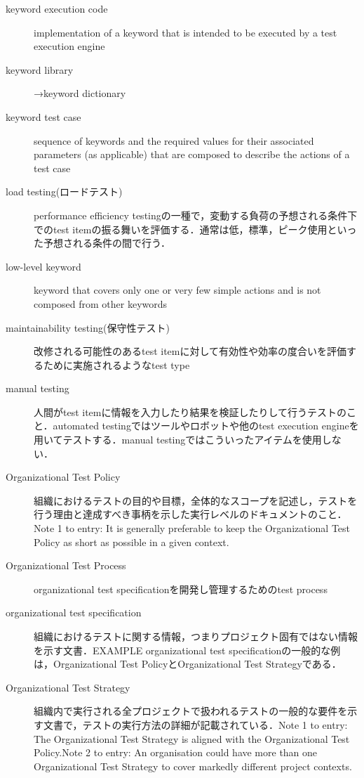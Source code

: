 \begin{description}
    \item[keyword execution code]implementation of a keyword that is intended to be executed by a test execution engine
    \item[keyword library]→keyword dictionary
    \item[keyword test case]sequence of keywords and the required values for their associated parameters (as applicable) that are composed to describe the actions of a test case
    \item[load testing(ロードテスト)]performance efficiency testingの一種で，変動する負荷の予想される条件下でのtest itemの振る舞いを評価する．通常は低，標準，ピーク使用といった予想される条件の間で行う．
    \item[low-level keyword]keyword that covers only one or very few simple actions and is not composed from other keywords
    \item[maintainability testing(保守性テスト)]改修される可能性のあるtest itemに対して有効性や効率の度合いを評価するために実施されるようなtest type
    \item[manual testing]人間がtest itemに情報を入力したり結果を検証したりして行うテストのこと．automated testingではツールやロボットや他のtest execution engineを用いてテストする．manual testingではこういったアイテムを使用しない．
    \item[Organizational Test Policy]組織におけるテストの目的や目標，全体的なスコープを記述し，テストを行う理由と達成すべき事柄を示した実行レベルのドキュメントのこと．Note 1 to entry: It is generally preferable to keep the Organizational Test Policy as short as possible in a given context.
    \item[Organizational Test Process]organizational test specificationを開発し管理するためのtest process
    \item[organizational test specification]組織におけるテストに関する情報，つまりプロジェクト固有ではない情報を示す文書．EXAMPLE organizational test specificationの一般的な例は，Organizational Test PolicyとOrganizational Test Strategyである．
    \item[Organizational Test Strategy]組織内で実行される全プロジェクトで扱われるテストの一般的な要件を示す文書で，テストの実行方法の詳細が記載されている．Note 1 to entry: The Organizational Test Strategy is aligned with the Organizational Test Policy.Note 2 to entry: An organisation could have more than one Organizational Test Strategy to cover markedly different project contexts.

\end{description}

